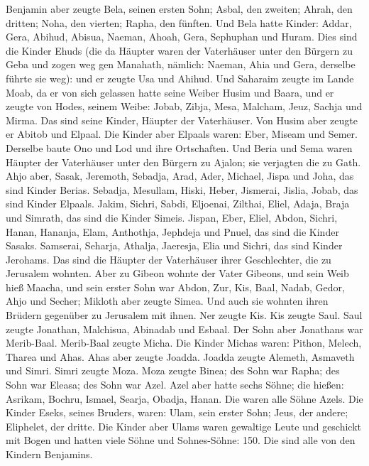  Benjamin aber zeugte Bela, seinen ersten Sohn; Asbal, den
zweiten; Ahrah, den dritten;  Noha, den vierten; Rapha,
den fünften.  Und Bela hatte Kinder: Addar, Gera, Abihud,
 Abisua, Naeman, Ahoah,  Gera, Sephuphan und
Huram.  Dies sind die Kinder Ehuds (die da Häupter waren
der Vaterhäuser unter den Bürgern zu Geba und zogen weg gen Manahath,
 nämlich: Naeman, Ahia und Gera, derselbe führte sie weg):
und er zeugte Usa und Ahihud.  Und Saharaim zeugte im
Lande Moab, da er von sich gelassen hatte seine Weiber Husim und Baara,
 und er zeugte von Hodes, seinem Weibe: Jobab, Zibja,
Mesa, Malcham,  Jeuz, Sachja und Mirma. Das sind seine
Kinder, Häupter der Vaterhäuser.  Von Husim aber zeugte
er Abitob und Elpaal.  Die Kinder aber Elpaals waren:
Eber, Miseam und Semer. Derselbe baute Ono und Lod und ihre Ortschaften.
 Und Beria und Sema waren Häupter der Vaterhäuser unter
den Bürgern zu Ajalon; sie verjagten die zu Gath.  Ahjo
aber, Sasak, Jeremoth,  Sebadja, Arad, Ader,
 Michael, Jispa und Joha, das sind Kinder Berias.
 Sebadja, Mesullam, Hiski, Heber, 
Jismerai, Jislia, Jobab, das sind Kinder Elpaals.  Jakim,
Sichri, Sabdi,  Eljoenai, Zilthai, Eliel, 
Adaja, Braja und Simrath, das sind die Kinder Simeis. 
Jispan, Eber, Eliel,  Abdon, Sichri, Hanan,
 Hananja, Elam, Anthothja,  Jephdeja und
Pnuel, das sind die Kinder Sasaks.  Samserai, Seharja,
Athalja,  Jaeresja, Elia und Sichri, das sind Kinder
Jerohams.  Das sind die Häupter der Vaterhäuser ihrer
Geschlechter, die zu Jerusalem wohnten.  Aber zu Gibeon
wohnte der Vater Gibeons, und sein Weib hieß Maacha,  und
sein erster Sohn war Abdon, Zur, Kis, Baal, Nadab, 
Gedor, Ahjo und Secher;  Mikloth aber zeugte Simea. Und
auch sie wohnten ihren Brüdern gegenüber zu Jerusalem mit ihnen.
 Ner zeugte Kis. Kis zeugte Saul. Saul zeugte Jonathan,
Malchisua, Abinadab und Esbaal.  Der Sohn aber Jonathans
war Merib-Baal. Merib-Baal zeugte Micha.  Die Kinder
Michas waren: Pithon, Melech, Tharea und Ahas.  Ahas aber
zeugte Joadda. Joadda zeugte Alemeth, Asmaveth und Simri. Simri zeugte
Moza.  Moza zeugte Binea; des Sohn war Rapha; des Sohn
war Eleasa; des Sohn war Azel.  Azel aber hatte sechs
Söhne; die hießen: Asrikam, Bochru, Ismael, Searja, Obadja, Hanan. Die
waren alle Söhne Azels.  Die Kinder Eseks, seines
Bruders, waren: Ulam, sein erster Sohn; Jeus, der andere; Eliphelet, der
dritte.  Die Kinder aber Ulams waren gewaltige Leute und
geschickt mit Bogen und hatten viele Söhne und Sohnes-Söhne: 150. Die
sind alle von den Kindern Benjamins.

